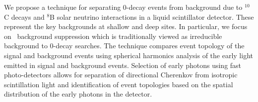 We propose a technique for separating 0{\nbb}-decay events from
background due to $^{10}$C decays and $^8$B solar neutrino
interactions in a liquid scintillator detector. These represent the
key backgrounds at shallow and deep sites. In particular, we focus
on \B~background suppression which is traditionally viewed as irreducible
background to 0\nbb-decay searches. The technique compares
event topology of the signal and background events using spherical
harmonics analysis of the early light emitted in signal and
background events. Selection of early photons using fast photo-detectors
allows for separation of directional Cherenkov from isotropic
scintillation light and identification of event topologies based
on the spatial distribution of the early photons in the detector.
